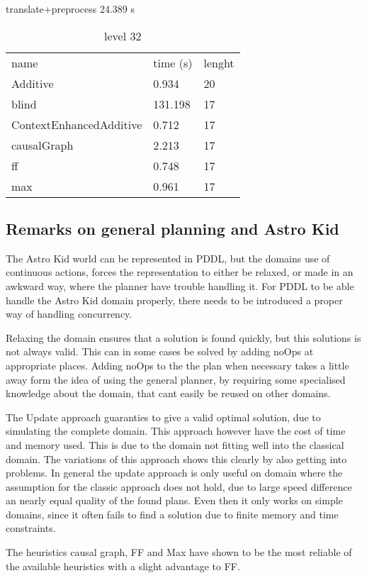 	\begin{table}[h]
		\centering
		\caption{level 32}
		\label{tablvl32}
		translate+preprocess
		24.389 s\\
		\begin{tabular}{lll}
			
			name & time (s)& lenght\\
			Additive & 0.934 & 20\\
			blind & 131.198 & 17\\
			ContextEnhancedAdditive & 0.712 & 17\\
			causalGraph & 2.213 & 17\\
			ff & 0.748 & 17\\
			max & 0.961 & 17\\
		\end{tabular}
	\end{table}
\subsection{Remarks on general planning and Astro Kid}
	The Astro Kid world can be represented in PDDL, but the domains use of continuous actions, forces the representation to either be relaxed, or made in an awkward way, where the planner have trouble handling it. For PDDL to be able handle the Astro Kid domain properly, there needs to be introduced a proper way of handling concurrency.

	Relaxing the domain ensures that a solution is found quickly, but this solutions is not always valid. This can in some cases be solved by adding noOps at appropriate places. Adding noOps to the the plan when necessary takes a little away form the idea of using the general planner, by requiring some specialised knowledge about the domain, that cant easily be reused on other domains.
	
	The Update approach guaranties to give a valid optimal solution, due to simulating the complete domain. This approach however have the cost of time and memory used. This is due to the domain not fitting well into the classical domain. The variations of this approach shows this clearly by also getting into problems. In general the update approach is only useful on domain where the assumption for the classic approach does not hold, due to large speed difference an nearly equal quality of the found plans. Even then it only works on simple domains, since it often fails to find a solution due to finite memory and time constraints.
	
	The heuristics causal graph, FF and Max have shown to be the most reliable of the available heuristics with a slight advantage to FF.
	
